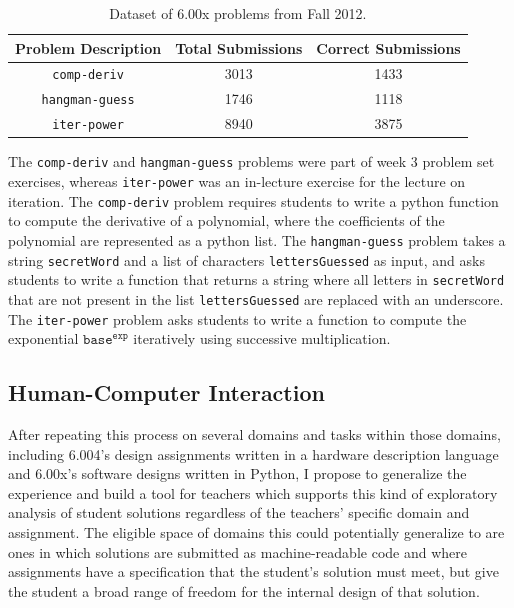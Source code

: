 \documentclass[12pt]{article}
\newcommand\tabhead[1]{\small\textbf{#1}}
\newcommand\codevar[1]{\texttt{#1}}
\begin{document}
\begin{table}
\begin{tabular} {|c|c|c|}
\hline
\tabhead{Problem Description} & \tabhead{Total Submissions} & \tabhead {Correct Submissions} \\ \hline
\codevar{comp-deriv} & 3013 & 1433 \\ \hline
\codevar{hangman-guess} & 1746 & 1118 \\ \hline
\codevar{iter-power} & 8940 & 3875 \\ \hline
\end{tabular}
\caption{Dataset of 6.00x problems from Fall 2012.}
\label{table-edx-probs}
\end{table}

The \codevar{comp-deriv} and \codevar{hangman-guess} problems were part of week 3 problem set exercises, whereas \codevar{iter-power} was an in-lecture exercise for the lecture on iteration. The \codevar{comp-deriv} problem requires students to write a python function to compute the derivative of a polynomial, where the coefficients of the polynomial are represented as a python list. The \codevar{hangman-guess} problem takes a string \codevar{secretWord} and a list of characters \codevar{lettersGuessed} as input, and asks students to write a function that returns a string where all letters in \codevar{secretWord} that are not present in the list \codevar{lettersGuessed} are replaced with an underscore. The \codevar{iter-power} problem asks students to write a function to compute the exponential $\codevar{base}^\codevar{exp}$ iteratively using successive multiplication.


\subsection{Human-Computer Interaction}

After repeating this process on several domains and tasks within those domains, including 6.004's design assignments written in a hardware description language and 6.00x's software designs written in Python, I propose to generalize the experience and build a tool for teachers which supports this kind of exploratory analysis of student solutions regardless of the teachers' specific domain and assignment. The eligible space of domains this could potentially generalize to are ones in which solutions are submitted as machine-readable code and where assignments have a specification that the student's solution must meet, but give the student a broad range of freedom for the internal design of that solution.
\end{document}
